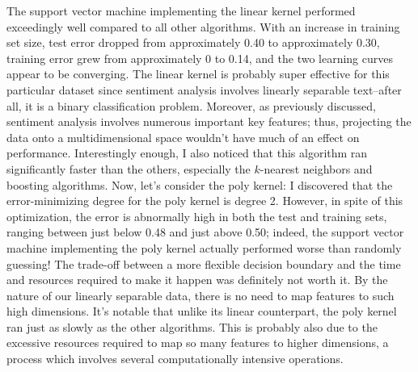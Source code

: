 \documentclass[11pt, a4paper]{article} %
\begin{document}
The support vector machine implementing the linear kernel performed exceedingly well compared to all other algorithms. With an increase in training set size, test error dropped from approximately 0.40 to approximately 0.30, training error grew from approximately 0 to 0.14, and the two learning curves appear to be converging. The linear kernel is probably super effective for this particular dataset since sentiment analysis involves linearly separable text--after all, it is a binary classification problem. Moreover, as previously discussed, sentiment analysis involves numerous important key features; thus, projecting the data onto a multidimensional space wouldn't have much of an effect on performance. Interestingly enough, I also noticed that this algorithm ran significantly faster than the others, especially the $k$-nearest neighbors and boosting algorithms.
\newline\newline
Now, let's consider the poly kernel: I discovered that the error-minimizing degree for the poly kernel is degree 2. However, in spite of this optimization, the error is abnormally high in both the test and training sets, ranging between just below 0.48 and just above 0.50; indeed, the support vector machine implementing the poly kernel actually performed worse than randomly guessing! The trade-off between a more flexible decision boundary and the time and resources required to make it happen was definitely not worth it. By the nature of our linearly separable data, there is no need to map features to such high dimensions. It's notable that unlike its linear counterpart, the poly kernel ran just as slowly as the other algorithms. This is probably also due to the excessive resources required to map so many features to higher dimensions, a process which involves several computationally intensive operations.
\end{document}
